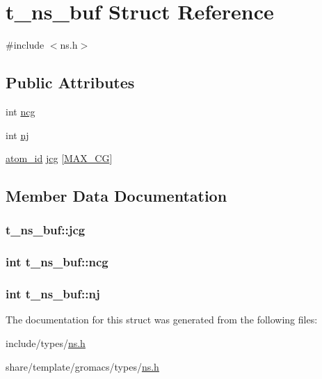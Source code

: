 \hypertarget{structt__ns__buf}{\section{t\-\_\-ns\-\_\-buf \-Struct \-Reference}
\label{structt__ns__buf}
}


{\ttfamily \#include $<$ns.\-h$>$}

\subsection*{\-Public \-Attributes}
\begin{DoxyCompactItemize}
\item 
int \hyperlink{structt__ns__buf_a4f4b16eee5a15b009eaaa49e90934896}{ncg}
\item 
int \hyperlink{structt__ns__buf_a32a18f81cd254223bcdd2f24fefe910c}{nj}
\item 
\hyperlink{include_2types_2simple_8h_ad3f47cdb48677e516e2049719612c737}{atom\-\_\-id} \hyperlink{structt__ns__buf_ac5658a6bdca1b8d0695e354db6727290}{jcg} \mbox{[}\hyperlink{share_2template_2gromacs_2types_2ns_8h_a0792353e8ab7f78db56cabc0c00f256d}{\-M\-A\-X\-\_\-\-C\-G}\mbox{]}
\end{DoxyCompactItemize}


\subsection{\-Member \-Data \-Documentation}
\hypertarget{structt__ns__buf_ac5658a6bdca1b8d0695e354db6727290}{
\subsubsection[{jcg}]{ {\bf t\-\_\-ns\-\_\-buf\-::jcg}}}\label{structt__ns__buf_ac5658a6bdca1b8d0695e354db6727290}
\hypertarget{structt__ns__buf_a4f4b16eee5a15b009eaaa49e90934896}{
\subsubsection[{ncg}]{\setlength{\rightskip}{0pt plus 5cm}int {\bf t\-\_\-ns\-\_\-buf\-::ncg}}}\label{structt__ns__buf_a4f4b16eee5a15b009eaaa49e90934896}
\hypertarget{structt__ns__buf_a32a18f81cd254223bcdd2f24fefe910c}{
\subsubsection[{nj}]{\setlength{\rightskip}{0pt plus 5cm}int {\bf t\-\_\-ns\-\_\-buf\-::nj}}}\label{structt__ns__buf_a32a18f81cd254223bcdd2f24fefe910c}


\-The documentation for this struct was generated from the following files\-:\begin{DoxyCompactItemize}
\item 
include/types/\hyperlink{include_2types_2ns_8h}{ns.\-h}\item 
share/template/gromacs/types/\hyperlink{share_2template_2gromacs_2types_2ns_8h}{ns.\-h}\end{DoxyCompactItemize}
